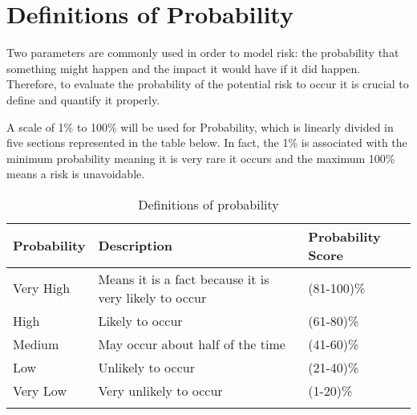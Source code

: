 \section{Definitions of Probability}

Two parameters are commonly used in order to model risk: the probability that something might happen and the impact it would have if it did happen. Therefore, to evaluate the probability of the potential risk to occur it is crucial to define and quantify it properly. 

A scale of 1\% to 100\% will be used for Probability, which is linearly divided in five sections represented in the table below. In fact, the 1\% is associated with the minimum probability meaning it is very rare it occurs and the maximum 100\% means a risk is unavoidable. 

\begin{longtable}[H]{l >{\raggedright\arraybackslash}p{7.8cm} p{4cm}}
	
	\toprule[2pt]
	
	\textbf{Probability} &  \textbf{Description}  & \textbf{Probability Score} \\
	
	\midrule [1.5pt]
	\endhead
	
	Very High & Means it is a fact because it is very likely to occur & (81-100)\%
	\vspace{0.2cm} \\
	
	\midrule
	
	High & Likely to occur & (61-80)\%
	\vspace{0.2cm} \\
	
	\midrule
	
	Medium & May occur about half of the time & (41-60)\% 
	\vspace{0.2cm} \\

	\midrule

	Low & Unlikely to occur & (21-40)\% 
	\vspace{0.2cm} \\

	\midrule

	Very Low & Very unlikely to occur & (1-20)\% 
	\vspace{0.2cm} \\
		
	\bottomrule[2pt]
	
	\caption{Definitions of probability}

\end{longtable}